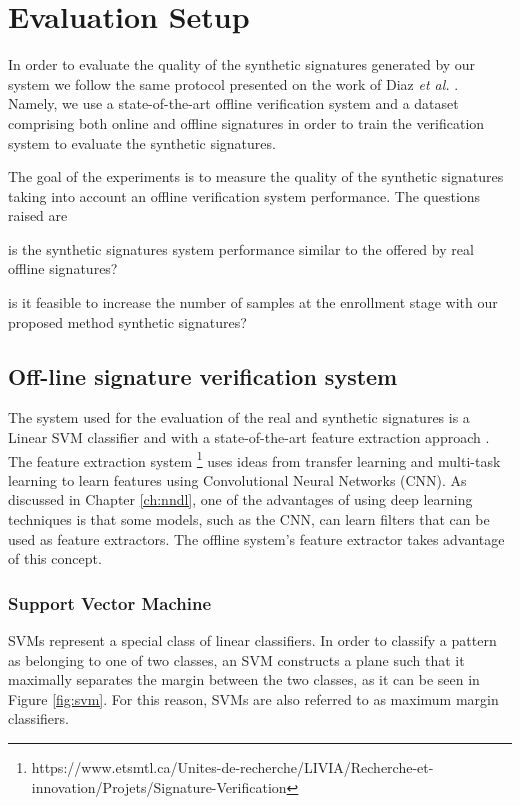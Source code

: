 
\chapter{Evaluation Setup}\label{ch:exp}

In order to evaluate the quality of the synthetic signatures generated by our system we follow the same protocol presented on the work of Diaz \textit{et al.} \cite{diaz2014generation}. Namely, we use a state-of-the-art offline verification system and a dataset comprising both online and offline signatures in order to train the verification system to evaluate the synthetic signatures.

The goal of the experiments is to measure the quality of the synthetic signatures taking into account an offline verification system performance. The questions raised are \begin{inlinelist}
  \item is the synthetic signatures system performance similar to the offered by real offline signatures?
  \item is it feasible to increase the number of samples at the enrollment stage with our proposed method synthetic signatures? 
\end{inlinelist}



\section{Off-line signature verification system}
The system used for the evaluation of the real and synthetic signatures is a Linear SVM classifier and with a state-of-the-art feature extraction approach  \cite{hafemann2017learning}. The feature extraction system \footnote{https://www.etsmtl.ca/Unites-de-recherche/LIVIA/Recherche-et-innovation/Projets/Signature-Verification} uses ideas from transfer learning and multi-task learning to learn features using Convolutional Neural Networks (CNN). As discussed in Chapter \ref{ch:nndl}, one of the advantages of using deep learning techniques is that some models, such as the CNN, can learn filters that can be used as feature extractors. The offline system's feature extractor takes advantage of this concept.

\subsection {Support Vector Machine} 
SVMs represent a special class of linear classifiers. In order to classify a pattern as
belonging to one of two classes, an SVM constructs a plane such that it maximally separates the margin between the two classes, as it can be seen in Figure \ref{fig:svm}. For this reason, SVMs are also referred to as maximum margin classifiers.


